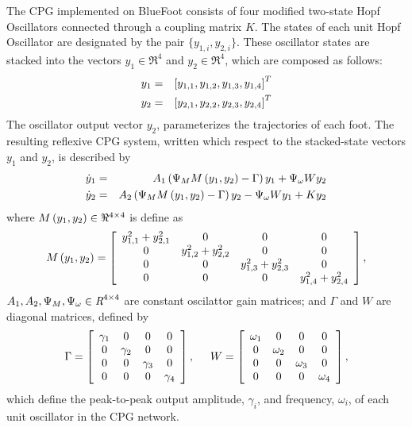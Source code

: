 		The CPG implemented on BlueFoot consists of four modified two-state Hopf Oscillators connected through a coupling matrix $K$. The states of each \Ith unit Hopf Oscillator are designated by the pair $\{y_{1,i},y_{2,i}\}$. These oscillator states are stacked into the vectors $y_{1}\in \Re^{4}$ and $y_{2}\in \Re^{4}$, which are composed as follows:
	\begin{eqnarray*}
		y_{1} &=& \left[y_{1,1},y_{1,2},y_{1,3},y_{1,4}\right]^{T}\nonumber\\
		y_{2} &=& \left[y_{2,1},y_{2,2},y_{2,3},y_{2,4}\right]^{T}
	\end{eqnarray*}
The oscillator output vector $y_{2}$, parameterizes the trajectories of each \Ith foot. The resulting reflexive CPG system, written which respect to the stacked-state vectors $y_{1}$ and $y_{2}$, is described by
		\begin{eqnarray}
			\dot{y}_{1} &=& A_{1}\wrap{ \Psi_{M} M\wrap{y_{1},y_{2}} - \Gamma}{y}_{1} + \Psi_{\omega} W {y}_{2} 			\nonumber\\
			\dot{y}_{2} &=& A_{2}\wrap{ \Psi_{M} M\wrap{y_{1},y_{2}} - \Gamma}{y}_{2} - \Psi_{\omega} W {y}_{1} + K {y}_{2}	%
			\label{eq::cpg_ss_def}
		\end{eqnarray}
		where $M\left(y_{1},y_{2}\right) \in \Re^{4\times4}$ is define as
		\newcommand{\yy}[1]{y_{1,#1}^{2} + y_{2,#1}^{2}}
		\begin{equation*}
			M\wrap{y_{1},y_{2}} = \left[
			\begin{array}{cccc}
			\yy{1} 	& 	0 		& 	0 		& 	0 		\\ 
			0		& 	\yy{2}  & 	0 		& 	0 		\\ 
			0 		& 	0 		& 	\yy{3}  & 	0 		\\ 
			0 		& 	0 		& 	0 		& 	\yy{4}  \\ 
			\end{array}
			\right],
		\end{equation*}
${A_{1},A_{2}, \Psi_{M}, \Psi_{\omega}} \in\emph{R}^{4\times4}$ are constant oscilattor gain matrices; and $\Gamma$ and $W$ are diagonal matrices, defined by
		\begin{equation*}
			\Gamma = \left[
			\begin{array}{cccc}
			\gamma_{1} 	& 	0 				& 	0 				& 	0 		\\ 
			0				& 	\gamma_{2} 	& 	0 				& 	0 		\\ 
			0 				& 	0 				& 	\gamma_{3} 	& 	0 		\\ 
			0 				& 	0 				& 	0 				& 	\gamma_{4}  \\ 
			\end{array}
			\right],
			\hspace{5mm}
			W = \left[
			\begin{array}{cccc}
			\omega_{1} 	& 	0 				& 	0 				& 	0 		\\ 
			0				& 	\omega_{2} 	& 	0 				& 	0 		\\ 
			0 				& 	0 				& 	\omega_{3} 	& 	0 		\\ 
			0 				& 	0 				& 	0 				& 	\omega_{4}  \\ 
			\end{array}
			\right],
		\end{equation*}
which define the peak-to-peak output amplitude, $\gamma_{i}$, and frequency, $\omega_{i}$, of each \Ith unit oscillator in the CPG network.


